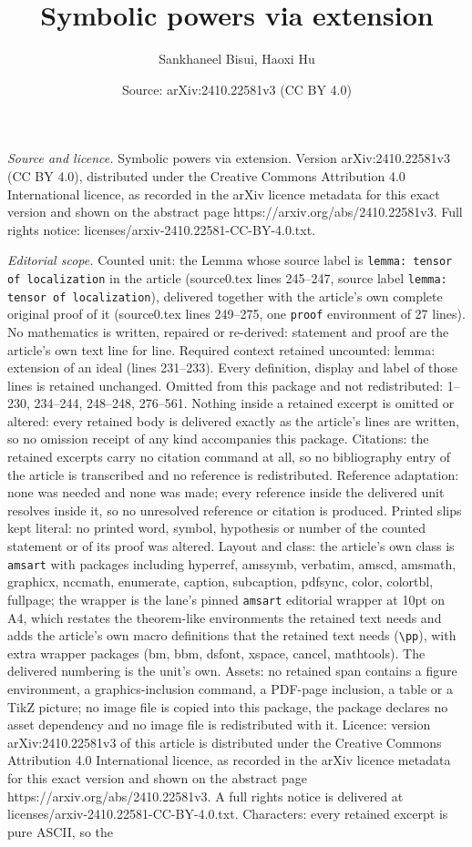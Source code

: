 \documentclass[10pt,a4paper]{amsart}
\title[Symbolic powers via extension]{Symbolic powers via extension}
\author{Sankhaneel Bisui, Haoxi Hu}
\date{Source: arXiv:2410.22581v3 (CC BY 4.0)}
\begin{document}
\maketitle

\noindent\emph{Source and licence.} Symbolic powers via extension. Version arXiv:2410.22581v3 (CC BY 4.0), distributed under the Creative Commons Attribution 4.0 International licence, as recorded in the arXiv licence metadata for this exact version and shown on the abstract page https://arxiv.org/abs/2410.22581v3. Full rights notice: licenses/arxiv-2410.22581-CC-BY-4.0.txt.\par\smallskip

\noindent\textit{Editorial scope.} Counted unit: the Lemma whose source label is \texttt{lemma: tensor of localization} in the article (source0.tex lines 245--247, source label \texttt{lemma: tensor of localization}), delivered together with the article's own complete original proof of it (source0.tex lines 249--275, one \texttt{proof} environment of 27 lines). No mathematics is written, repaired or re-derived: statement and proof are the article's own text line for line. Required context retained uncounted: lemma: extension of an ideal (lines 231--233). Every definition, display and label of those lines is retained unchanged. Omitted from this package and not redistributed: 1--230, 234--244, 248--248, 276--561. Nothing inside a retained excerpt is omitted or altered: every retained body is delivered exactly as the article's lines are written, so no omission receipt of any kind accompanies this package. Citations: the retained excerpts carry no citation command at all, so no bibliography entry of the article is transcribed and no reference is redistributed. Reference adaptation: none was needed and none was made; every reference inside the delivered unit resolves inside it, so no unresolved reference or citation is produced. Printed slips kept literal: no printed word, symbol, hypothesis or number of the counted statement or of its proof was altered. Layout and class: the article's own class is \texttt{amsart} with packages including hyperref, amssymb, verbatim, amscd, amsmath, graphicx, nccmath, enumerate, caption, subcaption, pdfsync, color, colortbl, fullpage; the wrapper is the lane's pinned \texttt{amsart} editorial wrapper at 10pt on A4, which restates the theorem-like environments the retained text needs and adds the article's own macro definitions that the retained text needs (\texttt{\textbackslash pp}), with extra wrapper packages (bm, bbm, dsfont, xspace, cancel, mathtools). The delivered numbering is the unit's own. Assets: no retained span contains a figure environment, a graphics-inclusion command, a PDF-page inclusion, a table or a TikZ picture; no image file is copied into this package, the package declares no asset dependency and no image file is redistributed with it. Licence: version arXiv:2410.22581v3 of this article is distributed under the Creative Commons Attribution 4.0 International licence, as recorded in the arXiv licence metadata for this exact version and shown on the abstract page https://arxiv.org/abs/2410.22581v3. A full rights notice is delivered at licenses/arxiv-2410.22581-CC-BY-4.0.txt. Characters: every retained excerpt is pure ASCII, so the 
\end{document}
